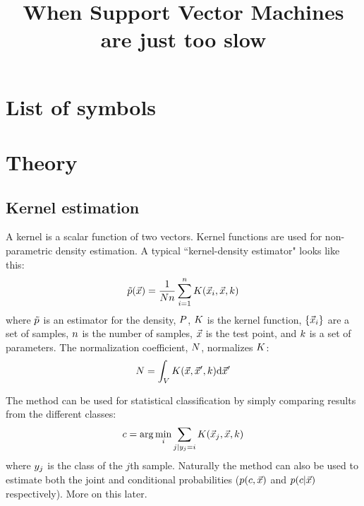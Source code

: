 \documentclass{article}
\title{When Support Vector Machines are just too slow}
\begin{document}


\section*{List of symbols}



\section{Theory}

\subsection{Kernel estimation}

A kernel is a scalar function of two vectors. Kernel functions are used for 
non-parametric density estimation. A typical ``kernel-density estimator"
looks like this:
\begin{equation}
	\tilde p(\vec {x}) = \frac {1}{N n} \sum_{i=1}^n K(\vec {x}_i, \vec {x}, k)
\end{equation}
where $\tilde p$ is an estimator for the density, $P$, 
$K$ is the kernel function,
$\lbrace \vec {x}_i \rbrace$ are a set of samples, 
$n$ is the number of samples,
$\vec {x}$ is the test point,
and $k$ is a set of parameters. 
The normalization coefficient, $N$, normalizes $K$:
\begin{equation}
	N = \int_V K(\vec {x}, \vec {x}^\prime, k) \mathrm d \vec {x}^\prime
\end{equation}

The method can be used for statistical classification by simply comparing
results from the different classes:
\begin{equation}
	c = \arg \min_i \sum_{j|y_j = i} K(\vec {x}_j, \vec {x}, k)
\end{equation}
where $y_j$ is the class of the $j$th sample. Naturally the method can also
be used to estimate both the joint and conditional probabilities 
($p(c, \vec x)$ and $p(c |\vec x)$ respectively). 
More on this later.
\end{document}
